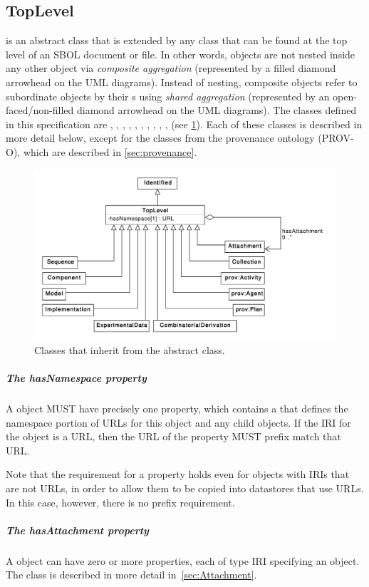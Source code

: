 \subsection {TopLevel}
\label{sec:TopLevel}
 is an abstract class that is extended by any  class that can be found at the top level of an SBOL document or file.
In other words,  objects are not nested inside any other object via \textit{composite aggregation} (represented by a filled diamond arrowhead on the UML diagrams).
Instead of nesting, composite  objects refer to subordinate  objects by their s using \textit{shared aggregation} (represented by an open-faced/non-filled diamond arrowhead on the UML diagrams).
The  classes defined in this specification are , , , , , , , , , ,  (see \ref{uml:toplevel}).
Each of these classes is described in more detail below, except for the classes from the provenance ontology (PROV-O), which are described in \ref{sec:provenance}.


\begin{figure}[ht]
\begin{center}
\includegraphics[width=\textwidth]{uml/toplevel}
\caption[]{Classes that inherit from the  abstract class.}
\label{uml:toplevel}
\end{center}
\end{figure}

\subparagraph{The hasNamespace property}
\label{sec:hasNamespace}
A  object MUST have precisely one  property, which contains a  that defines the namespace portion of URLs for this object and any child objects.
If the IRI for the  object is a URL, then the URL of the  property MUST prefix match that URL.

Note that the requirement for a  property holds even for objects with IRIs that are not URLs, in order to allow them to be copied into datastores that use URLs.  In this case, however, there is no prefix requirement.


\subparagraph{The hasAttachment property}
\label{sec:hasAttachment}
A  object can have zero or more  properties, each of type IRI specifying an  object. The  class is described in more detail in~\ref{sec:Attachment}.
